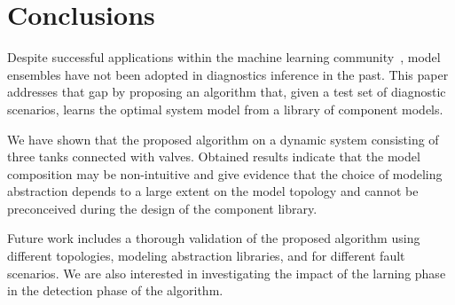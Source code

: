 \section{Conclusions}\label{sec:conclusions}
%
Despite successful applications within the machine learning community~\citep{brown2010ensemble,dietterich2000ensemble},
model ensembles have not been adopted in diagnostics inference in the past. This paper addresses that gap by proposing
an algorithm that, given a test set of diagnostic scenarios, learns the optimal system model from a library of component
models.

We have shown that the proposed algorithm on a dynamic system consisting of three tanks connected with valves. Obtained results
indicate that the model composition may be non-intuitive and give evidence that the choice of modeling abstraction depends
to a large extent on the model topology and cannot be preconceived during the design of the component library.

Future work includes a thorough validation of the proposed algorithm using different topologies, modeling abstraction
libraries, and for different fault scenarios. We are also interested in investigating the impact of the larning phase
in the detection phase of the algorithm.
